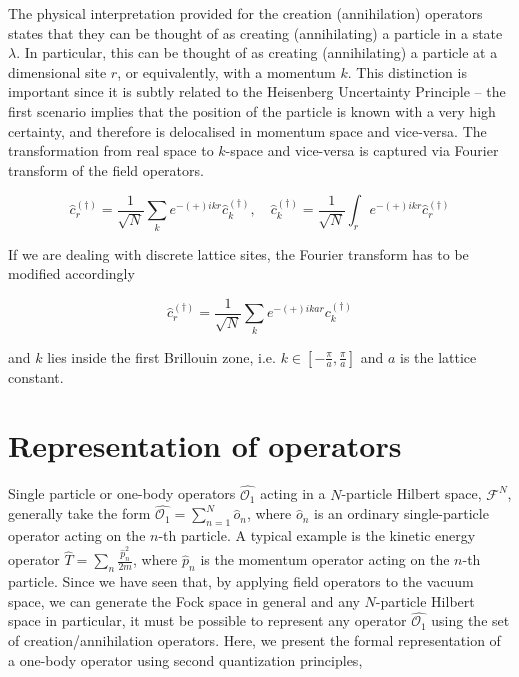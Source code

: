 The physical interpretation provided for the creation (annihilation) operators states that they can be thought of as creating (annihilating) a particle in a state $\lambda$. In particular, this can be thought of as creating (annihilating) a particle at a dimensional site $r$, or equivalently, with a momentum $k$. This distinction is important since it is subtly related to the Heisenberg Uncertainty Principle -- the first scenario implies that the position of the particle is known with a very high certainty, and therefore is delocalised in momentum space and vice-versa. The transformation from real space to $k$-space and vice-versa is captured via Fourier transform of the field operators.

\begin{equation}
    \hat{c}_{r}^{(\dagger)} = \frac{1}{\sqrt{N}}\sum_{k}e^{-(+)ikr} \hat{c}_{k}^{(\dagger)}, \quad \hat{c}_{k}^{(\dagger)} = \frac{1}{\sqrt{N}}\int_{r}e^{-(+)ikr} \hat{c}_{r}^{(\dagger)}
\end{equation}

If we are dealing with discrete lattice sites, the Fourier transform has to be modified accordingly

\begin{equation}
    \hat{c}_{r}^{(\dagger)} = \frac{1}{\sqrt{N}} \sum_{k}e^{-(+)ikar}c_{k}^{(\dagger)}
\end{equation}

and $k$ lies inside the first Brillouin zone, i.e. $k \in \left[-\frac{\pi}{a},\frac{\pi}{a}\right]$ and $a$ is the lattice constant.

\section{Representation of operators}

Single particle or one-body operators $\hat{\mathcal{O}_{1}}$ acting in a $N$-particle Hilbert space, $\mathcal{F}^{N}$, generally take the form $\hat{\mathcal{O}_{1}} = \sum_{n = 1}^{N}\hat{o}_{n}$, where $\hat{o}_{n}$ is an ordinary single-particle operator acting on the $n$-th particle. A typical example is the kinetic energy operator $\hat{T} = \sum_{n}\frac{\hat{p}_{n}^{2}}{2m}$, where $\hat{p}_{n}$ is the momentum operator acting on the $n$-th particle. Since we have seen that, by applying field operators to the vacuum space, we can generate the Fock space in general and any $N$-particle Hilbert space in particular, it must be possible to represent any operator $\hat{\mathcal{O}_{1}}$ using the set of creation/annihilation operators. Here, we present the formal representation of a one-body operator using second quantization principles,

